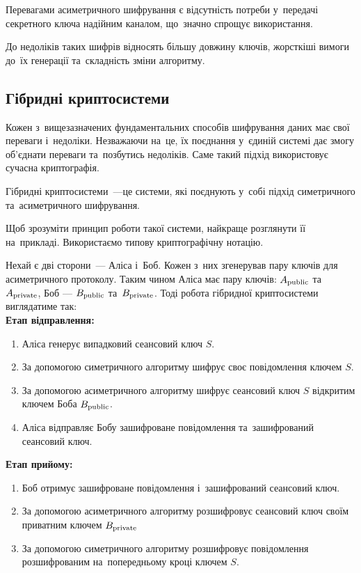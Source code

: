 \documentclass[a4paper,oneside,titlepage,14pt]{extarticle}
\begin{document}
			Перевагами асиметричного шифрування є відсутність потреби у~передачі секретного ключа надійним каналом, що~значно спрощує використання.\par
				
			До недоліків таких шифрів відносять більшу довжину ключів, жорсткіші вимоги до~їх генерації та~складність зміни алгоритму.\par
				
		\subsection{Гібридні криптосистеми}
			Кожен з~вищезазначених фундаментальних способів шифрування даних має свої переваги і~недоліки. Незважаючи на~це, їх поєднання у~єдиній системі дає змогу об'єднати переваги та~позбутись недоліків. Саме такий підхід використовує сучасна криптографія. \par
				
			Гібридні криптосистеми~---це системи, які поєднують у~собі підхід симетричного та~асиметричного шифрування.\par
				
			Щоб зрозуміти принцип роботи такої системи, найкраще розглянути її на~прикладі. Використаємо типову криптографічну нотацію.\par
				
			Нехай є дві сторони~--- Аліса і~Боб. Кожен з~них згенерував пару ключів для асиметричного протоколу. Таким чином Аліса має пару ключів: $A_{\textup{public}}$ та~$A_{\textup{private}}$, Боб --- $B_{\textup{public}}$ та~$B_{\textup{private}}$. Тоді робота гібридної криптосистеми виглядатиме так:\\
			\textbf{Етап відправлення:}
				\begin{enumerate}
					\item Аліса генерує випадковий сеансовий ключ $S$.
					\item За допомогою симетричного алгоритму шифрує своє повідомлення ключем $S$.
					\item За допомогою асиметричного алгоритму шифрує сеансовий ключ $S$ відкритим ключем Боба $B_{\textup{public}}$.
					\item Аліса відправляє Бобу зашифроване повідомлення та~зашифрований сеансовий ключ.
				\end{enumerate}
			\textbf{Етап прийому:}
				\begin{enumerate}
					\item Боб отримує зашифроване повідомлення і~зашифрований сеансовий ключ.
					\item За допомогою асиметричного алгоритму розшифровує сеансовий ключ своїм приватним ключем $B_\textup{private}$
					\item За допомогою симетричного алгоритму розшифровує повідомлення розшифрованим на~попередньому кроці ключем $S$.
				\end{enumerate}
			\par
				
\end{document}

